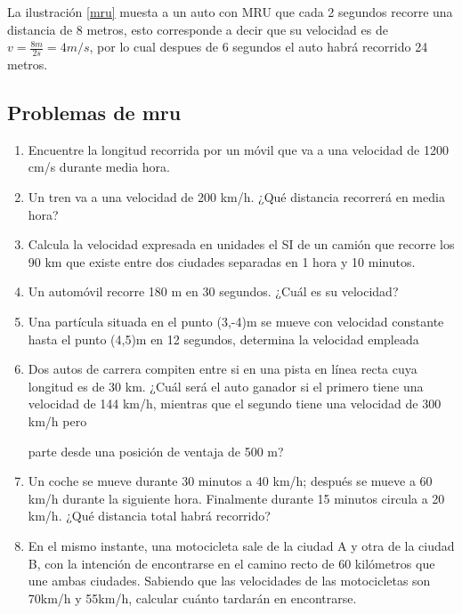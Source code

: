 \documentclass[a5paper,pagesize,10pt,bibtotoc,pointlessnumbers,
normalheadings,DIV=9,fleqn,x11names,table,twoside=false]{scrbook}
\begin{document}
La ilustración \ref{mru} muesta a un auto con MRU que cada 2 segundos recorre una distancia de 8 metros, esto  corresponde a 
decir que su velocidad es de $v = \frac{8m}{2s} = 4 m/s$, por lo cual despues de 6 segundos el auto habrá recorrido 24 metros.

\subsection{Problemas de mru}

\begin{enumerate}

\item Encuentre la longitud recorrida por un móvil que va a una velocidad de 1200 cm/s durante
 media hora. 

\item Un tren va a una velocidad de 200 km/h.
 ¿Qué distancia recorrerá en media hora? 

\item Calcula la velocidad expresada en unidades el SI de un camión que recorre los 90 km que
 existe entre dos ciudades 
separadas en 1 hora y 10 minutos. 

\item  Un automóvil recorre 180 m en 30 segundos. ¿Cuál es su
 velocidad? 

\item  Una partícula situada en el punto 
 (3,-4)m se mueve con velocidad constante hasta el punto (4,5)m en 12 segundos, 
determina la 
velocidad empleada

\item  Dos autos de carrera compiten entre si
 en una pista en
 línea recta cuya longitud es de 30 km. ¿Cuál será el auto 
ganador si el primero tiene una
 velocidad de 144 km/h, mientras que el segundo tiene una velocidad de 300 km/h pero

parte desde una posición de ventaja de 500 m?

\item Un coche se mueve durante 30 minutos a 40 km/h;
 después se mueve a 60 km/h durante la siguiente hora. Finalmente durante 
15 minutos
 circula a 20 km/h. ¿Qué distancia total habrá recorrido?
 
\item En el mismo instante, una motocicleta sale de la ciudad A y otra de la ciudad B, con la intención de encontrarse en el 
camino recto de 60 kilómetros que une ambas ciudades. Sabiendo que las velocidades de las motocicletas son 70km/h y 55km/h, 
calcular cuánto tardarán en encontrarse.


\end{enumerate}
\end{document}
